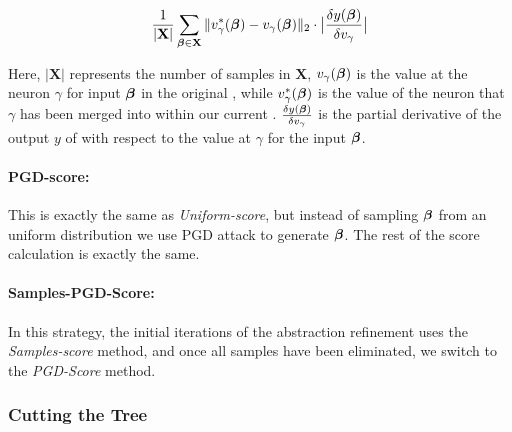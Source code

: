 \begin{equation*}
\begin{aligned}
    \frac{1}{|\mathbf{X}|} \sum_{\boldsymbol{\beta} \in \mathbf{X}} 
    \|v^{*}_{\gamma}(\boldsymbol{\beta}) - v_{\gamma}(\boldsymbol{\beta})\|_{2} \cdot 
    \big| \frac{\delta y(\boldsymbol{\beta})}{\delta v_{\gamma}} \big|
\end{aligned}
\end{equation*}

Here, $| \mathbf{X}|$ represents the number of samples in $\mathbf{X}$, 
$v_{\gamma}(\boldsymbol{\beta})$ is the value at the neuron $\gamma$ for input
$\boldsymbol{\beta}$ in the original \cnc, while $v^{*}_{\gamma}(\boldsymbol{\beta})$ is the
value of the neuron that $\gamma$ has been merged into within our current \abs.
$\frac{\delta y(\boldsymbol{\beta})}{\delta v_{\gamma}}$ is the partial derivative of
the output $y$ of \cnc with respect to the value at $\gamma$ for the input
$\boldsymbol{\beta}$.


\paragraph*{PGD-score:} This is exactly the same as \emph{Uniform-score}, but
instead of sampling $\boldsymbol{\beta}$ from an uniform distribution we use PGD attack
to generate $\boldsymbol{\beta}$. The rest of the score calculation is exactly the
same.

\paragraph*{Samples-PGD-Score:} In this strategy, the initial iterations of the
abstraction refinement uses the \emph{Samples-score} method, and once all
samples have been eliminated, we switch to the \emph{PGD-Score} method. 


\subsubsection{Cutting the Tree}

